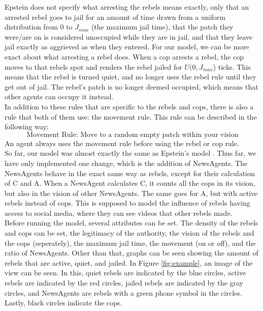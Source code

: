 \documentclass[a4paper,11pt]{article}
\begin{document}
Epstein does not specify what arresting the rebels means exactly, only that an arrested rebel goes to jail for an amount of time drawn from a uniform distribution from 0 to $J_{max}$ (the maximum jail time), that the patch they were/are on is considered unoccupied while they are in jail, and that they leave jail exactly as aggrieved as when they entered. For our model, we can be more exact about what arresting a rebel does. When a cop arrests a rebel, the cop moves to that rebels spot and renders the rebel jailed for $U(0,J_{max}$) ticks. This means that the rebel is turned quiet, and no longer uses the rebel rule until they get out of jail. The rebel's patch is no longer deemed occupied, which means that other agents can occupy it instead.
\\
In addition to these rules that are specific to the rebels and cops, there is also a rule that both of them use: the movement rule. This rule can be described in the following way:
\[\text{Movement Rule: Move to a random empty patch within your vision}\]
An agent always uses the movement rule before using the rebel or cop rule.\\
So far, our model was almost exactly the same as Epstein's model \cite{epstein2002modeling}. Thus far, we have only implemented one change, which is the addition of NewsAgents. The NewsAgents behave in the exact same way as rebels, except for their calculation of C and A. When a NewsAgent calculates C, it counts all the cops in its vision, but also in the vision of other NewsAgents. The same goes for A, but with active rebels instead of cops. This is supposed  to model the influence of rebels having access to social media, where they can see videos that other rebels made. 
\\
Before running the model, several attributes can be set. The density of the rebels and cops can be set, the legitimacy of the authority, the vision of the rebels and the cops (seperately), the maximum jail time, the movement (on or off), and the ratio of NewsAgents. Other than that, graphs can be seen showing the amount of rebels that are active, quiet, and jailed. In Figure \ref{fig:example}, an image of the view can be seen. In this, quiet rebels are indicated by the blue circles, active rebels are indicated by the red circles, jailed rebels are indicated by the gray circles, and NewsAgents are rebels with a green phone symbol in the circles. Lastly, black circles indicate the cops.
\end{document}
